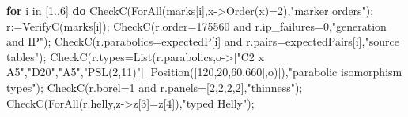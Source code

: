 \documentclass[
  10pt,
  letterpaper,
]{article}
\newenvironment{Shaded}{}{}
\newcommand{\BuiltInTok}[1]{\textcolor[rgb]{0.00,0.50,0.00}{#1}}
\newcommand{\ConstantTok}[1]{\textcolor[rgb]{0.53,0.00,0.00}{#1}}
\newcommand{\ControlFlowTok}[1]{\textcolor[rgb]{0.00,0.44,0.13}{\textbf{#1}}}
\newcommand{\ExtensionTok}[1]{#1}
\newcommand{\FloatTok}[1]{\textcolor[rgb]{0.25,0.63,0.44}{#1}}
\newcommand{\NormalTok}[1]{#1}
\newcommand{\OperatorTok}[1]{\textcolor[rgb]{0.40,0.40,0.40}{#1}}
\newcommand{\StringTok}[1]{\textcolor[rgb]{0.25,0.44,0.63}{#1}}
\newcommand{\VariableTok}[1]{\textcolor[rgb]{0.10,0.09,0.49}{#1}}
\begin{document}
\begin{Shaded}
\begin{Highlighting}[]
\ControlFlowTok{for} \VariableTok{i} \ExtensionTok{in}\NormalTok{ [}\FloatTok{1}\OperatorTok{..}\FloatTok{6}\NormalTok{] }\ControlFlowTok{do}
 \VariableTok{CheckC}\NormalTok{(}\BuiltInTok{ForAll}\NormalTok{(}\VariableTok{marks}\NormalTok{[}\VariableTok{i}\NormalTok{]}\OperatorTok{,}\VariableTok{x}\OperatorTok{{-}\textgreater{}}\BuiltInTok{Order}\NormalTok{(}\VariableTok{x}\NormalTok{)}\OperatorTok{=}\FloatTok{2}\NormalTok{)}\OperatorTok{,}\StringTok{"marker orders"}\NormalTok{)}\OperatorTok{;}
 \VariableTok{r}\OperatorTok{:=}\VariableTok{VerifyC}\NormalTok{(}\VariableTok{marks}\NormalTok{[}\VariableTok{i}\NormalTok{])}\OperatorTok{;}
 \VariableTok{CheckC}\NormalTok{(}\VariableTok{r}\NormalTok{.}\VariableTok{order}\OperatorTok{=}\FloatTok{175560} \ConstantTok{and} \VariableTok{r}\NormalTok{.}\VariableTok{ip\_failures}\OperatorTok{=}\FloatTok{0}\OperatorTok{,}\StringTok{"generation and IP"}\NormalTok{)}\OperatorTok{;}
 \VariableTok{CheckC}\NormalTok{(}\VariableTok{r}\NormalTok{.}\VariableTok{parabolics}\OperatorTok{=}\VariableTok{expectedP}\NormalTok{[}\VariableTok{i}\NormalTok{] }\ConstantTok{and} \VariableTok{r}\NormalTok{.}\VariableTok{pairs}\OperatorTok{=}\VariableTok{expectedPairs}\NormalTok{[}\VariableTok{i}\NormalTok{]}\OperatorTok{,}\StringTok{"source tables"}\NormalTok{)}\OperatorTok{;}
 \VariableTok{CheckC}\NormalTok{(}\VariableTok{r}\NormalTok{.}\VariableTok{types}\OperatorTok{=}\BuiltInTok{List}\NormalTok{(}\VariableTok{r}\NormalTok{.}\VariableTok{parabolics}\OperatorTok{,}\VariableTok{o}\OperatorTok{{-}\textgreater{}}\NormalTok{[}\StringTok{"C2 x A5"}\OperatorTok{,}\StringTok{"D20"}\OperatorTok{,}\StringTok{"A5"}\OperatorTok{,}\StringTok{"PSL(2,11)"}\NormalTok{]}
\NormalTok{  [}\BuiltInTok{Position}\NormalTok{([}\FloatTok{120}\OperatorTok{,}\FloatTok{20}\OperatorTok{,}\FloatTok{60}\OperatorTok{,}\FloatTok{660}\NormalTok{]}\OperatorTok{,}\VariableTok{o}\NormalTok{)])}\OperatorTok{,}\StringTok{"parabolic isomorphism types"}\NormalTok{)}\OperatorTok{;}
 \VariableTok{CheckC}\NormalTok{(}\VariableTok{r}\NormalTok{.}\VariableTok{borel}\OperatorTok{=}\FloatTok{1} \ConstantTok{and} \VariableTok{r}\NormalTok{.}\VariableTok{panels}\OperatorTok{=}\NormalTok{[}\FloatTok{2}\OperatorTok{,}\FloatTok{2}\OperatorTok{,}\FloatTok{2}\OperatorTok{,}\FloatTok{2}\NormalTok{]}\OperatorTok{,}\StringTok{"thinness"}\NormalTok{)}\OperatorTok{;}
 \VariableTok{CheckC}\NormalTok{(}\BuiltInTok{ForAll}\NormalTok{(}\VariableTok{r}\NormalTok{.}\VariableTok{helly}\OperatorTok{,}\VariableTok{z}\OperatorTok{{-}\textgreater{}}\VariableTok{z}\NormalTok{[}\FloatTok{3}\NormalTok{]}\OperatorTok{=}\VariableTok{z}\NormalTok{[}\FloatTok{4}\NormalTok{])}\OperatorTok{,}\StringTok{"typed Helly"}\NormalTok{)}\OperatorTok{;}

\end{Highlighting}
\end{Shaded}
\end{document}
